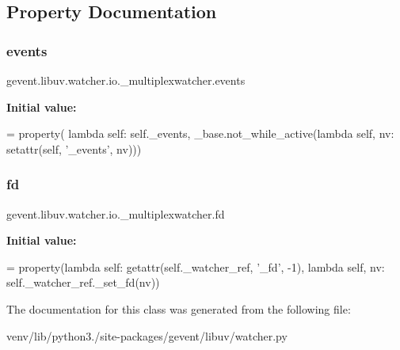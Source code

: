 \subsection{Property Documentation}
\mbox{\label{classgevent_1_1libuv_1_1watcher_1_1io_1_1__multiplexwatcher_aaeead52f76fafaad03f6cb4fb78f8dd7}} 
\subsubsection{\texorpdfstring{events}{events}}
{\footnotesize\ttfamily gevent.\+libuv.\+watcher.\+io.\+\_\+multiplexwatcher.\+events\hspace{0.3cm}{\ttfamily [static]}}

{\bfseries Initial value\+:}
\begin{DoxyCode}
=  property(
            \textcolor{keyword}{lambda} self: self.\_events,
            \_base.not\_while\_active(\textcolor{keyword}{lambda} self, nv: setattr(self, \textcolor{stringliteral}{'\_events'}, nv)))
\end{DoxyCode}
\mbox{\label{classgevent_1_1libuv_1_1watcher_1_1io_1_1__multiplexwatcher_a6ef49d8e12afabdc00d08ec6cc2d19e1}} 
\subsubsection{\texorpdfstring{fd}{fd}}
{\footnotesize\ttfamily gevent.\+libuv.\+watcher.\+io.\+\_\+multiplexwatcher.\+fd\hspace{0.3cm}{\ttfamily [static]}}

{\bfseries Initial value\+:}
\begin{DoxyCode}
=  property(\textcolor{keyword}{lambda} self: getattr(self.\_watcher\_ref, \textcolor{stringliteral}{'\_fd'}, -1),
                      \textcolor{keyword}{lambda} self, nv: self.\_watcher\_ref.\_set\_fd(nv))
\end{DoxyCode}


The documentation for this class was generated from the following file\+:\begin{DoxyCompactItemize}
\item 
venv/lib/python3./site-\/packages/gevent/libuv/watcher.\+py\end{DoxyCompactItemize}
